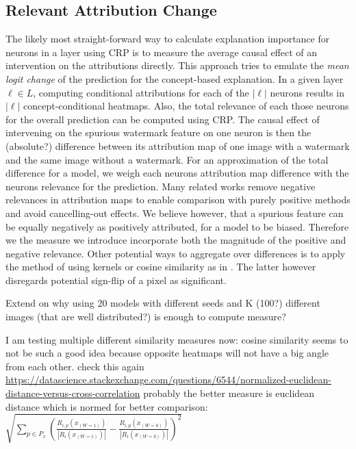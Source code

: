 \subsection{Relevant Attribution Change}
The likely most straight-forward way to calculate explanation importance for neurons in a layer using CRP is to measure the average causal effect of an intervention on the attributions directly. This approach tries to emulate the \textit{mean logit change} of the prediction for the concept-based explanation. In a given layer $\ell \in L$, computing conditional attributions for each of the $|\ell|$ neurons results in $|\ell|$ concept-conditional heatmaps. Also, the total relevance of each those neurons for the overall prediction can be computed using CRP.
The causal effect of intervening on the spurious watermark feature on one neuron is then the (absolute?) difference between its attribution map of one image with a watermark and the same image without a watermark. For an approximation of the total difference for a model, we weigh each neurons attribution map difference with the neurons relevance for the prediction. 
Many related works remove negative relevances in attribution maps to enable comparison with purely positive methods and avoid cancelling-out effects. We believe however, that a spurious feature can be equally negatively as positively attributed, for a model to be biased. Therefore we the measure we introduce incorporate both the magnitude of the positive and negative relevance. 
Other potential ways to aggregate over differences is to apply the method of \cite{Karimi2023} using kernels or cosine similarity as in \cite{Dreyer2023a}. The latter however disregards potential sign-flip of a pixel as significant. 

Extend on why using 20 models with different seeds and K (100?) different images (that are well distributed?) is enough to compute measure? 

I am testing multiple different similarity measures now:
cosine similarity seems to not be such a good idea because opposite heatmaps will not have a big angle from each other.
check this again \url{https://datascience.stackexchange.com/questions/6544/normalized-euclidean-distance-versus-cross-correlation}
probably the better measure is euclidean distance which is normed for better comparison:
$\sqrt{\sum_{p \in P_x}(\frac{R_{i,p}(x_{(W=1)})}{|R_{i}(x_{(W=1)})|} - \frac{R_{i,p}(x_{(W=0)})}{|R_{i}(x_{(W=0)})|})^2}$ \\

